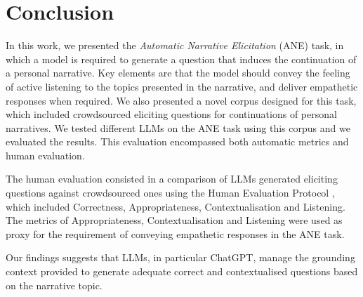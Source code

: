 \chapter{Conclusion}
\label{cha:conclusion}
In this work, we presented the \emph{Automatic Narrative Elicitation} (ANE) task, in which a model is required to generate a question that induces the continuation of a personal narrative. Key elements are that the model should convey the feeling of active listening to the topics presented in the narrative, and deliver empathetic responses when required. We also presented a novel corpus designed for this task, which included crowdsourced eliciting questions for continuations of personal narratives. We tested different LLMs on the ANE task using this corpus and we evaluated the results. This evaluation encompassed both automatic metrics and human evaluation. 

The human evaluation consisted in a comparison of LLMs generated eliciting questions against crowdsourced ones using the Human Evaluation Protocol \cite{mousavi-etal-2022-evaluation}, which included Correctness, Appropriateness, Contextualisation and Listening. The metrics of Appropriateness, Contextualisation and Listening were used as proxy for the requirement of conveying empathetic responses in the ANE task.

Our findings suggests that LLMs, in particular ChatGPT, manage the grounding context provided  to generate adequate correct and contextualised questions based on the narrative topic. 

